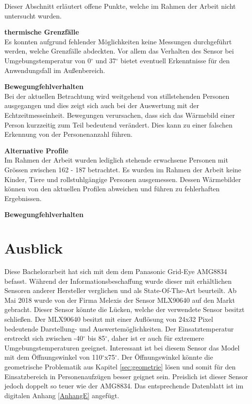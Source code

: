 Dieser Abschnitt erläutert offene Punkte, welche im Rahmen der Arbeit nicht untersucht wurden.

\textbf{thermische Grenzfälle}\\
Es konnten aufgrund fehlender Möglichkeiten keine Messungen durchgeführt werden, welche Grenzfälle abdeckten. Vor allem das Verhalten des Sensor bei Umgebungstemperatur von 0$^\circ$ und 37$^\circ$ bietet eventuell Erkenntnisse für den Anwendungsfall im Außenbereich.

\textbf{Bewegungfehlverhalten}\\
Bei der aktuellen Betrachtung wird weitgehend von stillstehenden Personen ausgegangen und dies zeigt sich auch bei der Auswertung mit der Echtzeitmesseinheit. Bewegungen verursachen, dass sich das Wärmebild einer Person kurzzeitig zum Teil bedeutend verändert. Dies kann zu einer falschen Erkennung von der Personenanzahl führen. 



\textbf{Alternative Profile}\\
Im Rahmen der Arbeit wurden lediglich stehende erwachsene Personen mit Grössen zwischen 162 - 187 betrachtet. Es wurden im Rahmen der Arbeit keine Kinder, Tiere und rollstuhlgängige Personen ausgemessen. Dessen Wärmebilder können von den aktuellen Profilen abweichen und führen zu fehlerhaften Ergebnissen.

\textbf{Bewegungfehlverhalten}\\

\section{Ausblick}

Diese Bachelorarbeit hat sich mit dem dem Panasonic Grid-Eye AMG8834 befasst. Während der Informationsbeschaffung wurde dieser mit erhältlichen Sensoren anderer Hersteller verglichen und als State-Of-The-Art beurteilt.  
Ab Mai 2018 wurde von der Firma Melexis der Sensor MLX90640 auf den Markt gebracht. Dieser Sensor könnte die Lücken, welche der verwendete Sensor besitzt schließen. Der MLX90640 besitzt mit einer Auflösung von 24x32 Pixel bedeutende Darstellung- und Auswertemöglichkeiten. Der Einsatztemperatur erstreckt sich zwischen -40$^\circ$ bis 85$^\circ$, daher ist er auch für extremere Umgebungstemperaturen geeignet. Interessant ist bei diesem Sensor das Model mit dem Öffnungswinkel von 110$^\circ$x75$^\circ$. Der Öffnungswinkel könnte die geometrische Problematik aus Kapitel \ref{sec:geometrie} lösen und somit für den Einsatzbereich in Personenaufzügen besser geignet sein. Preislich ist dieser Sensor jedoch doppelt so teuer wie der AMG8834. Das entsprechende Datenblatt ist im digitalen Anhang \ref{AnhangE} angefügt. 




